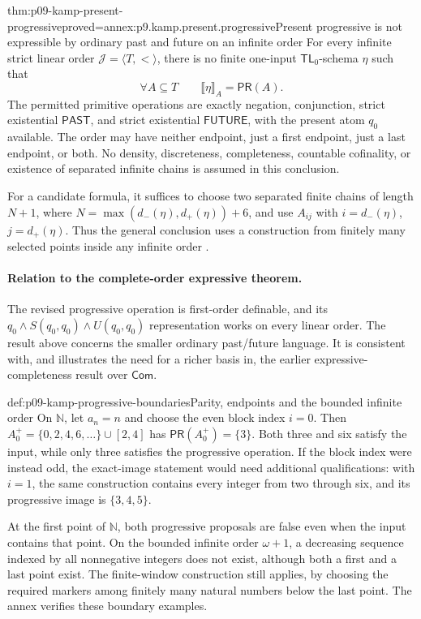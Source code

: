 \begin{hbtheorem}{thm:p09-kamp-present-progressive}{proved=annex:p9.kamp.present.progressive}{Present progressive is not expressible by ordinary past and future on an infinite order}
For every infinite strict linear order \(\mathcal J=\langle T,<\rangle\),
there is no finite one-input \(\mathsf{TL}_0\)-schema \(\eta\)
such that
\[
                  \forall A\subseteq T\qquad
                      \llbracket\eta\rrbracket_A=\mathsf{PR}(A).
\]
The permitted primitive operations are exactly negation, conjunction,
strict existential \(\mathsf{PAST}\), and strict existential
\(\mathsf{FUTURE}\), with the present atom \(q_0\) available.
The order may have neither endpoint, just a first endpoint, just a
last endpoint, or both. No density, discreteness, completeness,
countable cofinality, or existence of separated infinite chains is
assumed in this conclusion.

For a candidate formula, it suffices to choose two separated finite
chains of length \(N+1\), where
\(N=\max(d_-(\eta),d_+(\eta))+6\), and use
\(A_{ij}\) with \(i=d_-(\eta)\), \(j=d_+(\eta)\).
Thus the general conclusion uses a construction from finitely many
selected points inside any infinite order
\cite[pp.~19, 112--117]{Kamp1968}.
\end{hbtheorem}

\paragraph{Relation to the complete-order expressive theorem.}
The revised progressive operation is first-order definable, and its
\(q_0\land S(q_0,q_0)\land U(q_0,q_0)\) representation works
on every linear order. The result above concerns the smaller ordinary
past/future language. It is consistent with, and illustrates the need
for a richer basis in, the earlier expressive-completeness result over
\(\mathsf{Com}\).

\begin{hbexample}{def:p09-kamp-progressive-boundaries}{Parity, endpoints and the bounded infinite order}
On \(\mathbb N\), let \(a_n=n\) and choose the even block
index \(i=0\). Then
\(A_0^+=\{0,2,4,6,\ldots\}\cup[2,4]\) has
\(\mathsf{PR}(A_0^+)=\{3\}\). Both three and six satisfy
the input, while only three satisfies the progressive operation.
If the block index were instead odd, the exact-image statement would
need additional qualifications: with \(i=1\), the same construction
contains every integer from two through six, and its progressive image
is \(\{3,4,5\}\).

At the first point of \(\mathbb N\), both progressive proposals
are false even when the input contains that point. On the bounded
infinite order \(\omega+1\), a decreasing sequence indexed by all
nonnegative integers does not exist, although both a first and a last
point exist. The finite-window construction still applies, by choosing
the required markers among finitely many natural numbers below the
last point. The annex verifies these boundary examples.
\end{hbexample}
